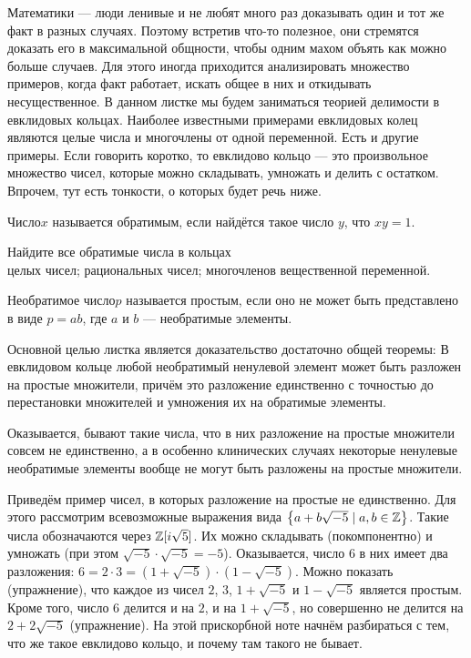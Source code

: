 \documentclass[a4paper,12pt]{article}
\begin{document}

\small
Математики --- люди ленивые и не любят много раз доказывать один и тот же факт в разных случаях.
Поэтому встретив что-то полезное, они стремятся доказать его в максимальной общности,
чтобы одним махом объять как можно больше случаев.
Для этого иногда приходится анализировать множество примеров, когда факт  работает,
искать общее в них и откидывать несущественное.
В данном листке мы будем заниматься теорией делимости в евклидовых кольцах.
Наиболее известными примерами евклидовых колец являются целые числа и многочлены от одной переменной.
Есть и другие примеры.
Если говорить коротко, то евклидово кольцо --- это произвольное множество  чисел,
которые можно складывать, умножать и делить с остатком.
Впрочем, тут есть тонкости, о которых будет речь ниже.

\normalsize
{}
 Число $x$ называется  обратимым, если найдётся такое число $y$, что $xy=1$.

Найдите все обратимые числа в кольцах\\
 целых чисел;
 рациональных чисел;
 многочленов вещественной переменной.

Необратимое  число $p$ называется  простым, если оно не может быть представлено в виде $p=ab$,
где $a$ и $b$ --- необратимые элементы.

\small
Основной целью листка является доказательство достаточно общей теоремы:
В евклидовом кольце любой необратимый ненулевой элемент может быть разложен на простые множители,
причём это разложение единственно с точностью до перестановки множителей и умножения их на обратимые элементы.

Оказывается, бывают такие  числа, что в них разложение на простые множители совсем не единственно,
а в особенно клинических случаях некоторые ненулевые необратимые элементы вообще не могут быть разложены на простые множители.

Приведём пример  чисел, в которых разложение на простые не единственно.
Для этого рассмотрим всевозможные выражения вида $\left\{a + b\sqrt{-5} \mid a,b\in\mathbb{Z}\right\}$.
Такие числа обозначаются через $\mathbb{Z}[i\sqrt{5}]$.
Их можно складывать (покомпонентно) и умножать (при этом $\sqrt{-5}\cdot\sqrt{-5} = -5$).
Оказывается, число $6$ в них имеет два разложения: $6=2\cdot 3 = (1+\sqrt{-5})\cdot(1-\sqrt{-5})$.
Можно показать (упражнение), что каждое из чисел $2$, $3$, $1+\sqrt{-5}$ и $1-\sqrt{-5}$ является простым.
Кроме того, число $6$ делится и на $2$, и на $1+\sqrt{-5}$, но совершенно не делится на $2+2\sqrt{-5}$ (упражнение).
На этой прискорбной ноте начнём разбираться с тем, что же такое евклидово кольцо, и почему там такого не бывает.
\end{document}
